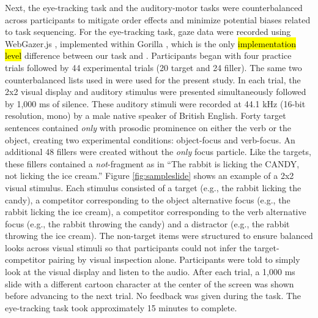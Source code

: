 Next, the eye-tracking task and the auditory-motor tasks were counterbalanced across participants to mitigate order effects and minimize potential biases related to task sequencing. For the eye-tracking task, gaze data were recorded using WebGazer.js \parencite{Papoutsaki}, implemented within Gorilla \parencite{Anwyl-Irvine_2019}, which is the only \hl{implementation level} difference between our task and \textcite{ge2021a}. Participants began with four practice trials followed by 44 experimental trials (20 target and 24 filler). The same two counterbalanced lists used in \textcite{ge2021a} were used for the present study. In each trial, the 2x2 visual display and auditory stimulus were presented simultaneously followed by 1,000 ms of silence. These auditory stimuli were recorded at 44.1 kHz (16-bit resolution, mono) by a male native speaker of British English. Forty target sentences contained \textit{only} with prosodic prominence on either the verb or the object, creating two experimental conditions: object-focus and verb-focus. An additional 48 fillers were created without the \textit{only} focus particle. Like the targets, these fillers contained a \textit{not}-fragment as in “The rabbit is licking the CANDY, not licking the ice cream.” Figure \ref{fig:sampleslide} shows an example of a 2x2 visual stimulus. Each stimulus consisted of a target (e.g., the rabbit licking the candy), a competitor corresponding to the object alternative focus (e.g., the rabbit licking the ice cream), a competitor corresponding to the verb alternative focus (e.g., the rabbit throwing the candy) and a distractor (e.g., the rabbit throwing the ice cream). The non-target items were structured to ensure balanced looks across visual stimuli so that participants could not infer the target-competitor pairing by visual inspection alone. Participants were told to simply look at the visual display and listen to the audio. After each trial, a 1,000 ms slide with a different cartoon character at the center of the screen was shown before advancing to the next trial. No feedback was given during the task. The eye-tracking task took approximately 15 minutes to complete.

